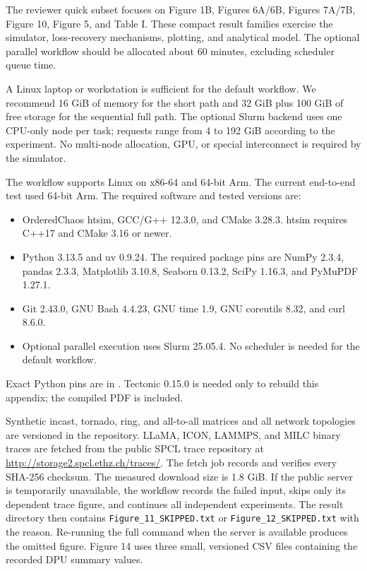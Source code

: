 \documentclass[conference]{IEEEtran}
\begin{document}
The reviewer quick subset focuses on Figure 1B, Figures 6A/6B, Figures 7A/7B,
Figure 10, Figure 5, and Table I. These compact result families exercise the
simulator, loss-recovery mechanisms, plotting, and analytical model. The
optional parallel workflow should be allocated about 60 minutes, excluding
scheduler queue time.

\artin
{}
A Linux laptop or workstation is sufficient for the default workflow. We
recommend 16 GiB of memory for the short path and 32 GiB plus 100 GiB of free
storage for the sequential full path. The optional Slurm backend uses one
CPU-only node per task; requests range from 4 to 192 GiB according to the
experiment. No multi-node allocation, GPU, or special interconnect is required
by the simulator.

The workflow supports Linux on x86-64 and 64-bit Arm. The current end-to-end
test used 64-bit Arm. The required software and tested versions are:
\begin{itemize}
\item OrderedChaos htsim, GCC/G++ 12.3.0, and CMake 3.28.3. htsim requires
C++17 and CMake 3.16 or newer.
\item Python 3.13.5 and uv 0.9.24. The required package pins are NumPy 2.3.4,
pandas 2.3.3, Matplotlib 3.10.8, Seaborn 0.13.2, SciPy 1.16.3, and PyMuPDF
1.27.1.
\item Git 2.43.0, GNU Bash 4.4.23, GNU time 1.9, GNU coreutils 8.32, and curl
8.6.0.
\item Optional parallel execution uses Slurm 25.05.4. No scheduler is needed
for the default workflow.
\end{itemize}
Exact Python pins are in . Tectonic 0.15.0
is needed only to rebuild this appendix; the compiled PDF is included.

Synthetic incast, tornado, ring, and all-to-all matrices and all network
topologies are versioned in the repository. LLaMA, ICON, LAMMPS, and MILC
binary traces are fetched from the public SPCL trace repository at
\url{http://storage2.spcl.ethz.ch/traces/}. The fetch job records and verifies
every SHA-256 checksum. The measured download size is 1.8 GiB. If the public
server is temporarily unavailable, the workflow records the failed input,
skips only its dependent trace figure, and continues all independent
experiments. The result directory then contains
\texttt{Figure\_11\_SKIPPED.txt} or
\texttt{Figure\_12\_SKIPPED.txt} with the reason. Re-running the full command
when the server is available produces the omitted figure. Figure 14 uses three
small, versioned CSV files containing the recorded DPU summary values.
\end{document}
